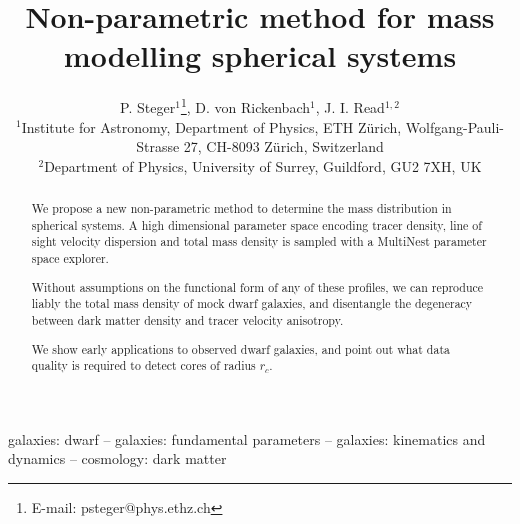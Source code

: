 \documentclass[useAMS,usenatbib]{mn2e}
\title[Non-parametric method for mass modelling spherical systems]{Non-parametric method for mass modelling spherical systems}
\author[Steger]{P. Steger$^1$\thanks{E-mail: psteger@phys.ethz.ch}, D. von Rickenbach$^1$, J. I. Read$^{1,2}$\\
$^1$Institute for Astronomy, Department of Physics, ETH Z\"urich, Wolfgang-Pauli-Strasse 27, CH-8093 Z\"urich, Switzerland\\
$^2$Department of Physics, University of Surrey, Guildford, GU2 7XH, UK
}
\begin{document}
\maketitle

\begin{abstract}
We propose a new non-parametric method to determine the mass
distribution in spherical systems. A high dimensional parameter space
encoding tracer density, line of sight velocity dispersion and total
mass density is sampled with a MultiNest parameter space explorer.

Without assumptions on the functional form of any of these profiles,
we can reproduce liably the total mass density of mock dwarf galaxies,
and disentangle the degeneracy between dark matter density and tracer
velocity anisotropy.

We show early applications to observed dwarf galaxies, and point out
what data quality is required to detect cores of radius $r_c$.
\end{abstract}

\begin{keywords} galaxies: dwarf  -- galaxies: fundamental parameters  -- galaxies: kinematics and dynamics -- cosmology: dark matter
\end{keywords}










%
\end{document}
